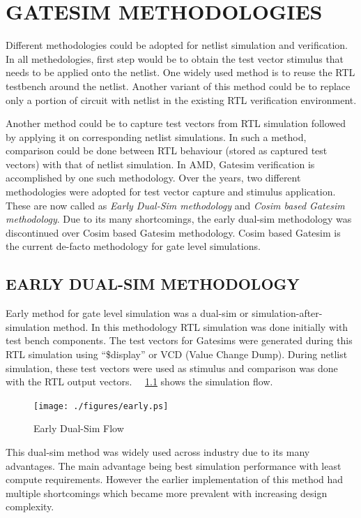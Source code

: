 \chapter{GATESIM METHODOLOGIES}
\label{chap:methodologies.tex}

Different methodologies could be adopted for netlist simulation and verification. In all methedologies, first step would be to obtain the test vector stimulus that needs to be applied onto the netlist. One widely used method is to reuse the RTL testbench around the netlist. Another variant of this method could be to replace only a portion of circuit with netlist in the existing RTL verification environment.

Another method could be to capture test vectors from RTL simulation followed by applying it on corresponding netlist simulations. In such a method, comparison could be done between RTL behaviour (stored as captured test vectors) with that of netlist simulation.  In AMD, Gatesim verification is accomplished by one such methodology. Over the years, two different methodologies were adopted for test vector capture and stimulus application. These are now called as {\it Early Dual-Sim methodology} and {\it Cosim based Gatesim methodology}. Due to its many shortcomings, the early dual-sim methodology was discontinued over Cosim based Gatesim methodology. Cosim based Gatesim is the current de-facto methodology for gate level simulations.


\section{EARLY DUAL-SIM METHODOLOGY}
Early method for gate level simulation was a dual-sim or simulation-after-simulation method. In this methodology RTL simulation was done initially with test bench components. The test vectors for Gatesims were generated during this RTL simulation using ``\$display'' or VCD (Value Change Dump). During netlist simulation, these test vectors were used as stimulus and comparison was done with the RTL output vectors. ~\figurename{~\ref{fig:early.ps}} shows the simulation flow. %

\begin{figure}[h]
\centering
\texttt{[image: ./figures/early.ps]}
\caption{Early Dual-Sim Flow}
\label{fig:early.ps}
\end{figure}

This dual-sim method was widely used across industry due to its many advantages. The main advantage being best simulation performance with least compute requirements. However the earlier implementation of this method had multiple shortcomings which became more prevalent with increasing design complexity.
